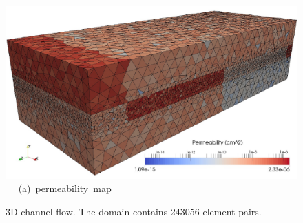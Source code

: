 \begin{figure}[ht]
\vbox{\vspace{-.5cm}
      \hbox{\includegraphics[width=\textwidth]{./Pics1/3D_Channel/Test_SlowNew_MeshPermeability.pdf} }
      \hbox{\hspace{5.0cm} (a) permeability map }}
\caption{3D channel flow. The domain contains 243056  element-pairs.}
\label{fig:3DChannel_PermMesh}
\end{figure}
\clearpage



